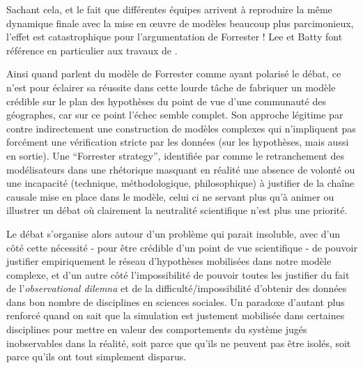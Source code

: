 


Sachant cela, et le fait que différentes équipes arrivent à reproduire la même dynamique finale avec la mise en œuvre de modèles beaucoup plus parcimonieux, l'effet est catastrophique pour l'argumentation de Forrester ! Lee  et Batty font référence en particulier aux travaux de \autocite{Stonebraker1972}.

Ainsi quand \textcite{Batty2001} parlent du modèle de Forrester comme ayant polarisé le débat, ce n'est pour éclairer sa réussite dans cette lourde tâche de fabriquer un modèle crédible sur le plan des hypothèses du point de vue d'une communauté des géographes, car sur ce point l'échec semble complet. Son approche légitime par contre indirectement une construction de modèles complexes qui n'impliquent pas forcément une vérification stricte par les données (sur les hypothèses, mais aussi en sortie). Une \foreignquote{english}{Forrester strategy}, identifiée par \textcite[7-8]{Batty2001} comme le retranchement des modélisateurs dans une rhétorique masquant en réalité une absence de volonté ou une incapacité (technique, méthodologique, philosophique) à justifier de la chaîne causale mise en place dans le modèle, celui ci ne servant plus qu'à animer ou illustrer un débat où clairement la neutralité scientifique n'est plus une priorité.

Le débat s'organise alors autour d'un problème qui parait insoluble, avec d'un côté cette nécessité - pour être crédible d'un point de vue scientifique - de pouvoir justifier empiriquement le réseau d'hypothèses mobilisées dans notre modèle complexe, et d'un autre côté l'impossibilité de pouvoir toutes les justifier du fait de l'\textit{observational dilemna} et de la difficulté/impossibilité d'obtenir des données dans bon nombre de disciplines en sciences sociales. Un paradoxe d'autant plus renforcé quand on sait que la simulation est justement mobilisée dans certaines disciplines pour mettre en valeur des comportements du système jugés inobservables dans la réalité, soit parce que qu'ils ne peuvent pas être isolés, soit parce qu'ils ont tout simplement disparus.

